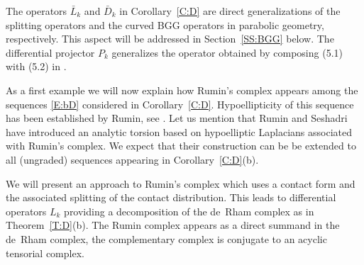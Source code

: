 \documentclass[reqno,12pt]{amsart}
\theoremstyle{plain}
\theoremstyle{definition}
\begin{document}
The operators $\bar L_k$ and $\bar D_k$ in Corollary~\ref{C:D} are direct generalizations of the splitting operators and the curved BGG operators in parabolic geometry, respectively.
This aspect will be addressed in Section~\ref{SS:BGG} below.
The differential projector $P_k$ generalizes the operator obtained by composing (5.1) with (5.2) in \cite{CD01}.


As a first example we will now explain how Rumin's complex \cite{R90,R94} appears among the sequences \eqref{E:bD} considered in Corollary~\ref{C:D}.
Hypoellipticity of this sequence has been established by Rumin, see \cite[Section~3]{R94}.
Let us mention that Rumin and Seshadri \cite{RS12} have introduced an analytic torsion based on hypoelliptic Laplacians associated with Rumin's complex.
We expect that their construction can be be extended to all (ungraded) sequences appearing in Corollary~\ref{C:D}(b).


We will present an approach to Rumin's complex which uses a contact form and the associated splitting of the contact distribution.
This leads to differential operators $L_k$ providing a decomposition of the de~Rham complex as in Theorem~\ref{T:D}(b).
The Rumin complex appears as a direct summand in the de~Rham complex, the complementary complex is conjugate to an acyclic tensorial complex.
\end{document}
